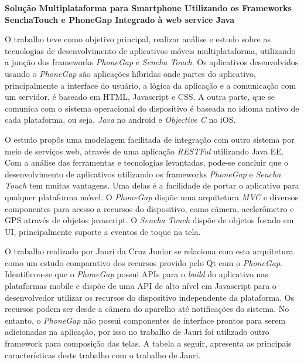 \textbf{Solução Multiplataforma para Smartphone Utilizando os Frameworks SenchaTouch e PhoneGap Integrado à web service Java} \cite{jauridacruzjunior}\par
O trabalho teve como objetivo principal, realizar análise e estudo sobre as tecnologias de desenvolvimento de aplicativos móveis multiplataforma, utilizando a junção dos frameworks \textit{PhoneGap} e \textit{Sencha Touch}. Os aplicativos desenvolvidos usando o \textit{PhoneGap} são aplicações híbridas onde partes do aplicativo, principalmente a interface do usuário, a lógica da aplicação e a comunicação com um servidor, é baseado em HTML, Javascript e CSS. A outra parte, que se comunica com o sistema operacional do dispositivo é baseada no idioma nativo de cada plataforma, ou seja, \textit{Java} no android e \textit{Objective C} no iOS.\par
O estudo propôs uma modelagem facilitada de integração com outro sistema por meio de serviços web, através de uma aplicação \textit{RESTFul} utilizando Java EE. Com a análise das ferramentas e tecnologias levantadas, pode-se concluir que o desenvolvimento de aplicativos utilizando os frameworks \textit{PhoneGap} e \textit{Sencha Touch} tem muitas vantagens. Uma delas é a facilidade de portar o aplicativo para qualquer plataforma móvel. O  \textit{PhoneGap} dispõe uma arquitetura \textit{MVC} e diversos componentes para acesso a recursos do dispositivo, como câmera, acelerômetro e GPS através de objetos javascript. O \textit{Sencha Touch} dispõe de objetos focado em UI, principalmente suporte a eventos de toque na tela.\par

O trabalho realizado por Jauri da Cruz Junior se relaciona com esta arquitetura como um estudo comparativo dos recursos provido pelo Qt com o \textit{PhoneGap}. Identificou-se que o \textit{PhoneGap} possui APIs para o \textit{build} do aplicativo nas plataformas mobile e dispõe de uma API de alto nível em Javascript para o desenvolvedor utilizar os recursos do dispositivo independente da plataforma. Os recursos podem ser desde a câmera do aparelho até notificações do sistema. No entanto, o \textit{PhoneGap} não possui componentes de interface prontos para serem adicionadas na aplicação, por isso no trabalho de Jauri foi utilizado outro framework para composição das telas. A tabela a seguir, apresenta as principais características deste trabalho com o trabalho de Jauri.

